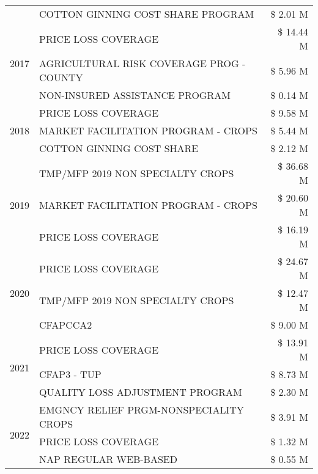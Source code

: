 \begin{tabular}{llr}
 & COTTON GINNING COST SHARE PROGRAM & \$ 2.01 M \\
\cline{1-3}
\multirow[t]{3}{*}{2017} & PRICE LOSS COVERAGE & \$ 14.44 M \\
 & AGRICULTURAL RISK COVERAGE PROG - COUNTY & \$ 5.96 M \\
 & NON-INSURED ASSISTANCE PROGRAM & \$ 0.14 M \\
\cline{1-3}
\multirow[t]{3}{*}{2018} & PRICE LOSS COVERAGE & \$ 9.58 M \\
 & MARKET FACILITATION PROGRAM - CROPS & \$ 5.44 M \\
 & COTTON GINNING COST SHARE & \$ 2.12 M \\
\cline{1-3}
\multirow[t]{3}{*}{2019} & TMP/MFP 2019 NON SPECIALTY CROPS & \$ 36.68 M \\
 & MARKET FACILITATION PROGRAM - CROPS & \$ 20.60 M \\
 & PRICE LOSS COVERAGE & \$ 16.19 M \\
\cline{1-3}
\multirow[t]{3}{*}{2020} & PRICE LOSS COVERAGE & \$ 24.67 M \\
 & TMP/MFP 2019 NON SPECIALTY CROPS & \$ 12.47 M \\
 & CFAPCCA2 & \$ 9.00 M \\
\cline{1-3}
\multirow[t]{3}{*}{2021} & PRICE LOSS COVERAGE & \$ 13.91 M \\
 & CFAP3 - TUP & \$ 8.73 M \\
 & QUALITY LOSS ADJUSTMENT PROGRAM & \$ 2.30 M \\
\cline{1-3}
\multirow[t]{3}{*}{2022} & EMGNCY RELIEF PRGM-NONSPECIALITY CROPS & \$ 3.91 M \\
 & PRICE LOSS COVERAGE & \$ 1.32 M \\
 & NAP REGULAR WEB-BASED & \$ 0.55 M \\
\cline{1-3}
\bottomrule
\end{tabular}
